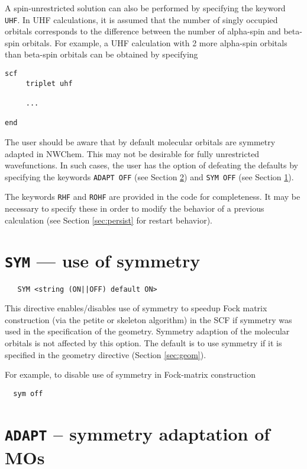 A spin-unrestricted solution can also be performed by specifying the
keyword \verb+UHF+.  In UHF calculations, it is assumed that the
number of singly occupied orbitals corresponds to the difference
between the number of alpha-spin and beta-spin orbitals.  For example,
a UHF calculation with 2 more alpha-spin orbitals than beta-spin
orbitals can be obtained by specifying

\begin{verbatim}
scf
     triplet uhf

     ...

end
\end{verbatim}

The user should be aware that by default molecular orbitals are
symmetry adapted in NWChem.  This may not be desirable for fully
unrestricted wavefunctions.  In such cases, the user has the option of
defeating the defaults by specifying the keywords \verb+ADAPT OFF+
(see Section \ref{sec:adapt}) and \verb+SYM OFF+ (see Section
\ref{sec:sym}).

The keywords \verb+RHF+ and \verb+ROHF+ are provided in the code for
completeness. It may be necessary to specify these in order to modify
the behavior of a previous calculation (see Section \ref{sec:persist}
  for restart behavior).

\section{{\tt SYM} --- use of symmetry}
\label{sec:sym}

 \begin{verbatim}
   SYM <string (ON||OFF) default ON>
 \end{verbatim}

This directive enables/disables use of symmetry to speedup Fock matrix
construction (via the petite or skeleton algorithm) in the SCF if
symmetry was used in the specification of the geometry.  Symmetry
adaption of the molecular orbitals is not affected by this option.
The default is to use symmetry if it is specified in the geometry
directive (Section \ref{sec:geom}). 

For example, to disable use of symmetry in Fock-matrix construction
\begin{verbatim}
  sym off
\end{verbatim}

\section{{\tt ADAPT} -- symmetry adaptation of MOs}
\label{sec:adapt}

